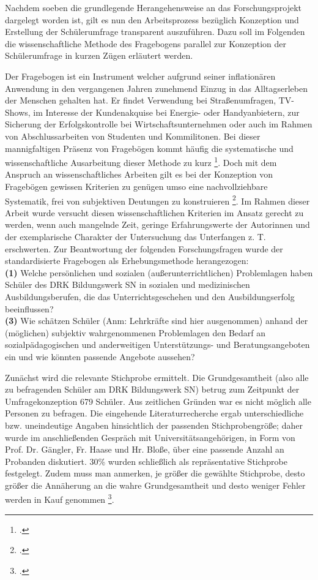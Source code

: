 Nachdem soeben die grundlegende Herangehensweise an das Forschungsprojekt dargelegt worden ist, gilt es nun den Arbeitsprozess bezüglich Konzeption und Erstellung der Schülerumfrage transparent auszuführen. Dazu soll im Folgenden die wissenschaftliche Methode des Fragebogens parallel zur Konzeption der Schülerumfrage in kurzen Zügen erläutert werden.

Der Fragebogen ist ein Instrument welcher aufgrund seiner inflationären Anwendung in den vergangenen Jahren zunehmend Einzug in das Alltagserleben der Menschen gehalten hat. Er findet Verwendung bei Straßenumfragen, TV-Shows, im Interesse der Kundenakquise bei Energie- oder Handyanbietern, zur Sicherung der Erfolgskontrolle bei Wirtschaftsunternehmen oder auch im Rahmen von Abschlussarbeiten von Studenten und Kommilitonen. Bei dieser mannigfaltigen Präsenz von Fragebögen kommt häufig die systematische und wissenschaftliche Ausarbeitung dieser Methode zu kurz \footcite[vgl.][11]{Kallus2010}. Doch mit dem Anspruch an wissenschaftliches Arbeiten gilt es bei der Konzeption von Fragebögen gewissen Kriterien zu genügen umso eine nachvollziehbare Systematik, frei von subjektiven Deutungen zu konstruieren \footcite[vgl.][9]{Mayer2013}. Im Rahmen dieser Arbeit wurde versucht diesen wissenschaftlichen Kriterien im Ansatz gerecht zu werden, wenn auch mangelnde Zeit, geringe Erfahrungswerte der Autorinnen und der exemplarische Charakter der Untersuchung das Unterfangen z. T. erschwerten. Zur Beantwortung der folgenden Forschungsfragen wurde der standardisierte Fragebogen als Erhebungsmethode herangezogen:\\
 
\noindent
\textbf{(1)} Welche persönlichen und sozialen (außerunterrichtlichen) Problemlagen haben Schüler des DRK Bildungswerk SN in sozialen und medizinischen Ausbildungsberufen, die das Unterrichtsgeschehen und den Ausbildungserfolg beeinflussen?\\

\noindent
\textbf{(3)} Wie schätzen Schüler (Anm: Lehrkräfte sind hier ausgenommen) anhand der (möglichen) subjektiv wahrgenommenen Problemlagen den Bedarf an sozialpädagogischen und anderweitigen Unterstützungs- und Beratungsangeboten ein und wie könnten passende Angebote aussehen?

\noindent
Zunächst wird die relevante Stichprobe ermittelt. Die Grundgesamtheit (also alle zu befragenden Schüler am DRK Bildungswerk SN) betrug zum Zeitpunkt der Umfragekonzeption 679 Schüler. Aus zeitlichen Gründen war es nicht möglich alle Personen zu befragen. Die eingehende Literaturrecherche ergab unterschiedliche bzw. uneindeutige Angaben hinsichtlich der passenden Stichprobengröße; daher wurde im anschließenden Gespräch mit Universitätsangehörigen, in Form von Prof. Dr. Gängler, Fr. Haase und Hr. Bloße, über eine passende Anzahl an Probanden diskutiert. 30\% wurden schließlich als repräsentative Stichprobe festgelegt. Zudem muss man anmerken, je größer die gewählte Stichprobe, desto größer die Annäherung an die wahre Grundgesamtheit und desto weniger Fehler werden in Kauf genommen \footcite[vgl.][65f]{Mayer2013}. 

